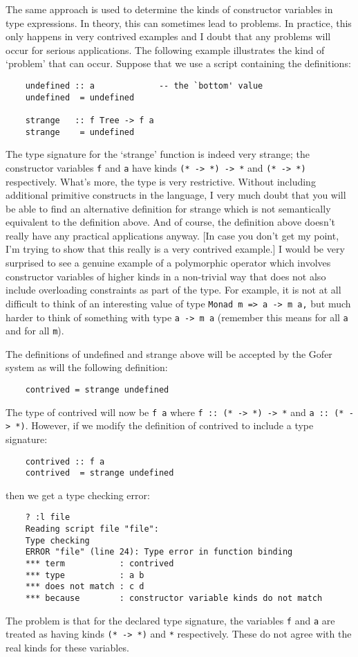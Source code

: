 The same approach is used to determine the kinds of constructor
variables in type expressions.  In theory, this can sometimes lead to
problems.  In practice, this only happens in very contrived examples
and I doubt that any problems will occur for serious applications.  The
following example illustrates the kind of `problem' that can occur.
Suppose that we use a script containing the definitions:
\begin{verbatim}
    undefined :: a             -- the `bottom' value
    undefined  = undefined

    strange   :: f Tree -> f a
    strange    = undefined
\end{verbatim}    
The type signature for the `strange' function is indeed very strange;
the constructor variables \verb"f" and \verb"a" have kinds \verb"(* -> *) -> *" and \verb"(* -> *)"
respectively.  What's more, the type is very restrictive.  Without
including additional primitive constructs in the language, I very much
doubt that you will be able to find an alternative definition for
strange which is not semantically equivalent to the definition above.
And of course, the definition above doesn't really have any practical
applications anyway.  [In case you don't get my point, I'm trying to
show that this really is a very contrived example.]  I would be very
surprised to see a genuine example of a polymorphic operator which
involves constructor variables of higher kinds in a non-trivial way
that does not also include overloading constraints as part of the
type.  For example, it is not at all difficult to think of an
interesting value of type \verb"Monad m => a -> m a," but much harder to think
of something with type \verb"a -> m a" (remember this means for all \verb"a" and for
all \verb"m").

The definitions of undefined and strange above will be accepted by the
Gofer system as will the following definition:
\begin{verbatim}
    contrived = strange undefined
\end{verbatim}
The type of contrived will now be  \verb"f a"  where \verb"f :: (* -> *) -> *" and
\verb"a :: (* -> *)".  However, if we modify the definition of contrived to
include a type signature:
\begin{verbatim}
    contrived :: f a
    contrived  = strange undefined
\end{verbatim}
then we get a type checking error:
\begin{verbatim}
    ? :l file
    Reading script file "file":
    Type checking      
    ERROR "file" (line 24): Type error in function binding
    *** term           : contrived
    *** type           : a b
    *** does not match : c d
    *** because        : constructor variable kinds do not match
\end{verbatim}
The problem is that for the declared type signature, the variables \verb"f" and
\verb"a" are treated as having kinds \verb"(* -> *)" and \verb"*" respectively.  These do not
agree with the real kinds for these variables.

